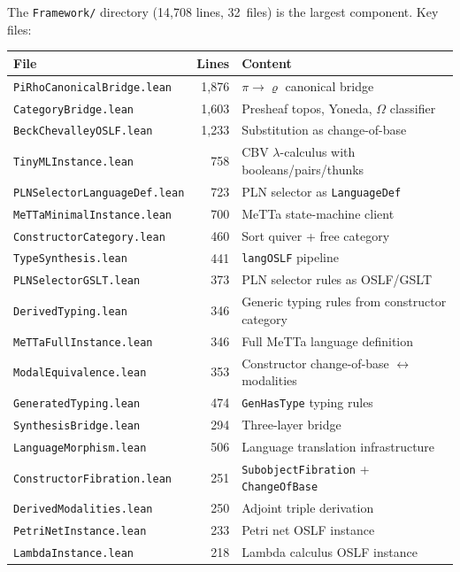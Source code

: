 \documentclass[]{article}
\newcommand{\code}[1]{\texttt{#1}}
\newcommand{\rhocalc}{\ensuremath{\varrho}}
\newcommand{\OSLF}{\textup{OSLF}}
\newcommand{\GSLT}{\textup{GSLT}}
\begin{document}
The \code{Framework/} directory (14{,}708 lines, 32~files) is the largest component.
Key files:

\begin{center}
\begin{tabular}{lrl}
\textbf{File} & \textbf{Lines} & \textbf{Content} \\
\hline
\code{PiRhoCanonicalBridge.lean}  & 1{,}876 & $\pi \to \rhocalc{}$ canonical bridge \\
\code{CategoryBridge.lean}        & 1{,}603 & Presheaf topos, Yoneda, $\Omega$ classifier \\
\code{BeckChevalleyOSLF.lean}     & 1{,}233 & Substitution as change-of-base \\
\code{TinyMLInstance.lean}        &   758 & CBV $\lambda$-calculus with booleans/pairs/thunks \\
\code{PLNSelectorLanguageDef.lean}&   723 & PLN selector as \code{LanguageDef} \\
\code{MeTTaMinimalInstance.lean}  &   700 & MeTTa state-machine client \\
\code{ConstructorCategory.lean}   &   460 & Sort quiver + free category \\
\code{TypeSynthesis.lean}         &   441 & \code{langOSLF} pipeline \\
\code{PLNSelectorGSLT.lean}      &   373 & PLN selector rules as \OSLF{}/\GSLT{} \\
\code{DerivedTyping.lean}         &   346 & Generic typing rules from constructor category \\
\code{MeTTaFullInstance.lean}     &   346 & Full MeTTa language definition \\
\code{ModalEquivalence.lean}      &   353 & Constructor change-of-base $\leftrightarrow$ modalities \\
\code{GeneratedTyping.lean}       &   474 & \code{GenHasType} typing rules \\
\code{SynthesisBridge.lean}       &   294 & Three-layer bridge \\
\code{LanguageMorphism.lean}      &   506 & Language translation infrastructure \\
\code{ConstructorFibration.lean}  &   251 & \code{SubobjectFibration} + \code{ChangeOfBase} \\
\code{DerivedModalities.lean}     &   250 & Adjoint triple derivation \\
\code{PetriNetInstance.lean}      &   233 & Petri net \OSLF{} instance \\
\code{LambdaInstance.lean}        &   218 & Lambda calculus \OSLF{} instance \\

\end{tabular}
\end{center}
\end{document}
